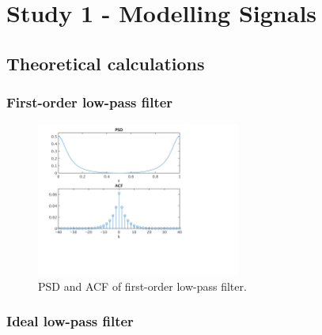 \section{Study 1 - Modelling Signals}


\subsection{Theoretical calculations}


\subsubsection{First-order low-pass filter}

\begin{figure}[!ht]
\centering
\includegraphics[width=0.6\textwidth]{bilder/Lab1/Lab1fig1.svg}
\caption{PSD and ACF of first-order low-pass filter.}
\label{fig:Lab1fig1}
\end{figure}


\subsubsection{Ideal low-pass filter}

